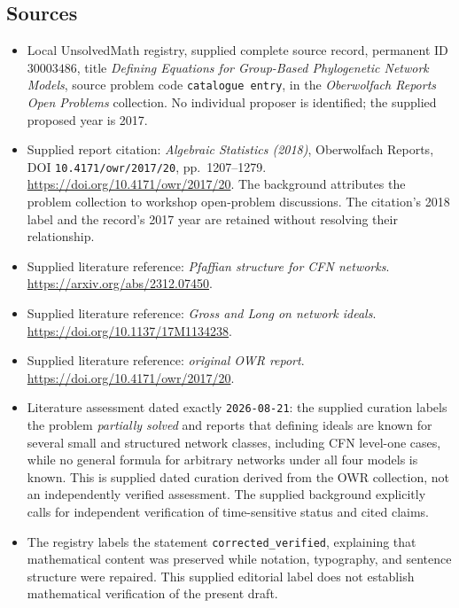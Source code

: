 \documentclass[11pt]{article}
\begin{document}
\subsection{Sources}
\begin{itemize}
\item Local UnsolvedMath registry, supplied complete source record, permanent ID \(30003486\), title \emph{Defining Equations for Group-Based Phylogenetic Network Models}, source problem code \texttt{catalogue entry}, in the \emph{Oberwolfach Reports Open Problems} collection. No individual proposer is identified; the supplied proposed year is 2017.
\item Supplied report citation: \emph{Algebraic Statistics (2018)}, Oberwolfach Reports, DOI \texttt{10.4171/owr/2017/20}, pp.\ 1207--1279. \url{https://doi.org/10.4171/owr/2017/20}. The background attributes the problem collection to workshop open-problem discussions. The citation's 2018 label and the record's 2017 year are retained without resolving their relationship.
\item Supplied literature reference: \emph{Pfaffian structure for CFN networks}. \url{https://arxiv.org/abs/2312.07450}.
\item Supplied literature reference: \emph{Gross and Long on network ideals}. \url{https://doi.org/10.1137/17M1134238}.
\item Supplied literature reference: \emph{original OWR report}. \url{https://doi.org/10.4171/owr/2017/20}.
\item Literature assessment dated exactly \texttt{2026-08-21}: the supplied curation labels the problem \emph{partially solved} and reports that defining ideals are known for several small and structured network classes, including CFN level-one cases, while no general formula for arbitrary networks under all four models is known. This is supplied dated curation derived from the OWR collection, not an independently verified assessment. The supplied background explicitly calls for independent verification of time-sensitive status and cited claims.
\item The registry labels the statement \texttt{corrected\_verified}, explaining that mathematical content was preserved while notation, typography, and sentence structure were repaired. This supplied editorial label does not establish mathematical verification of the present draft.
\end{itemize}
\end{document}
